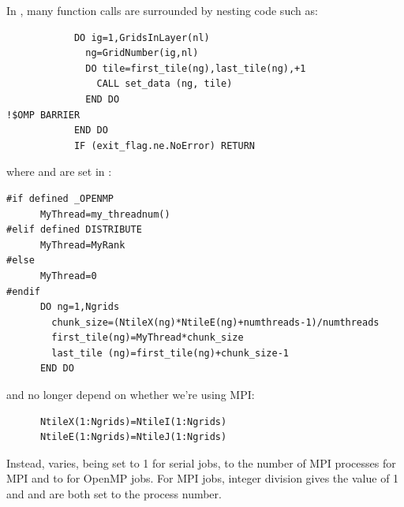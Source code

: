 In , many function calls are surrounded by
nesting code such as:
\begin{verbatim}
            DO ig=1,GridsInLayer(nl)
              ng=GridNumber(ig,nl)
              DO tile=first_tile(ng),last_tile(ng),+1
                CALL set_data (ng, tile)
              END DO
!$OMP BARRIER
            END DO
            IF (exit_flag.ne.NoError) RETURN
\end{verbatim}
where  and  are set in
:
\begin{verbatim}
#if defined _OPENMP
      MyThread=my_threadnum()
#elif defined DISTRIBUTE
      MyThread=MyRank
#else
      MyThread=0
#endif
      DO ng=1,Ngrids
        chunk_size=(NtileX(ng)*NtileE(ng)+numthreads-1)/numthreads
        first_tile(ng)=MyThread*chunk_size
        last_tile (ng)=first_tile(ng)+chunk_size-1
      END DO
\end{verbatim}
 and  no longer depend on whether we're
using MPI:
\begin{verbatim}
      NtileX(1:Ngrids)=NtileI(1:Ngrids)
      NtileE(1:Ngrids)=NtileJ(1:Ngrids)
\end{verbatim}
Instead,  varies, being set to 1 for serial jobs,
to the number of MPI processes for MPI and to
 for OpenMP jobs. For MPI jobs,
integer division gives  the value of 1 and
 and  are both set to the process
number.

